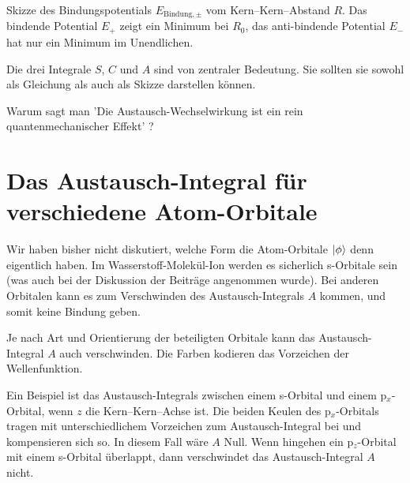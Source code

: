 \begin{marginfigure}

\caption{Skizze des Bindungspotentials $E_{\text{Bindung}, \pm}$ vom Kern--Kern--Abstand $R$. Das bindende Potential $E_+$ zeigt ein Minimum bei $R_0$, das anti-bindende Potential $E_-$ hat nur ein Minimum im Unendlichen.}
\end{marginfigure}




\begin{questions} 
\item Die drei Integrale $S$, $C$ und $A$ sind von zentraler Bedeutung. Sie sollten sie sowohl als Gleichung als auch als Skizze darstellen können.

\item Warum sagt man 'Die Austausch-Wechselwirkung ist ein rein quantenmechanischer Effekt' ?
\end{questions}



\section{Das Austausch-Integral für verschiedene Atom-Orbitale}

Wir haben bisher nicht diskutiert, welche Form die Atom-Orbitale $\ket{\phi}$ denn eigentlich haben.
Im Wasserstoff-Molekül-Ion   werden es sicherlich s-Orbitale sein (was auch bei der Diskussion der Beiträge angenommen wurde). Bei anderen Orbitalen kann es zum Verschwinden des Austausch-Integrals $A$ kommen, und somit keine Bindung geben.

\begin{marginfigure}

\caption{Je nach Art und Orientierung der beteiligten Orbitale kann das Austausch-Integral $A$ auch verschwinden. Die Farben kodieren das Vorzeichen der Wellenfunktion. }
\end{marginfigure}



Ein Beispiel ist das Austausch-Integrals zwischen  einem s-Orbital und einem p$_x$-Orbital, wenn $z$ die Kern--Kern--Achse ist.  Die beiden Keulen des  p$_x$-Orbitals tragen mit unterschiedlichem Vorzeichen zum Austausch-Integral bei und kompensieren sich so. In diesem Fall wäre $A$ Null. Wenn hingehen ein p$_z$-Orbital mit einem s-Orbital überlappt, dann verschwindet das  Austausch-Integral $A$ nicht.


